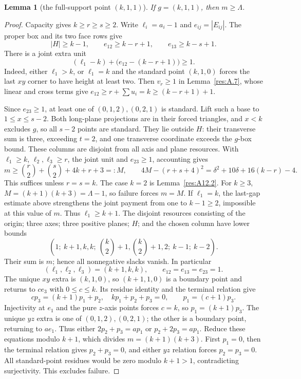 \documentclass[11pt]{article}
\newtheorem{lemma}[theorem]{Lemma}
\theoremstyle{definition}
\theoremstyle{remark}
\theoremstyle{plain}
\begin{document}
\begin{lemma}[the full-support point $(k,1,1)$]\label{res:A12.7}
If $g=(k,1,1)$, then $m\ge \Lambda$.
\end{lemma}
\begin{proof}
Capacity gives $k\ge r\ge s\ge2$.  Write $\ell_i=a_i-1$ and
$e_{ij}=|E_{ij}|$.  The proper box and its two face rows give
\[
 |H|\ge k-1,\qquad e_{12}\ge k-r+1,\qquad e_{13}\ge k-s+1.
\]
There is a joint extra unit
\[
 (\ell_1-k)+\bigl(e_{12}-(k-r+1)\bigr)\ge1.
\]
Indeed, either $\ell_1>k$, or $\ell_1=k$ and the standard point
$(k,1,0)$ forces the last $xy$ corner to have height at least two.
Then $v_r\ge1$ in Lemma~\ref{res:A.7}, whose linear and cross terms give
$e_{12}\ge r+\sum u_i=k\ge(k-r+1)+1$.

Since $e_{23}\ge1$, at least one of $(0,1,2),(0,2,1)$ is standard.
Lift such a base to $1\le x\le s-2$.  Both long-plane projections
are in their forced triangles, and $x<k$ excludes $g$, so all $s-2$
points are standard.  They lie outside $H$: their transverse sum is
three, exceeding $t=2$, and one transverse coordinate exceeds the
$g$-box bound.  These columns are disjoint from all axis and plane
resources.  With $\ell_1\ge k$, $\ell_2,\ell_3\ge r$, the joint unit
and $e_{23}\ge1$, accounting gives
\[
 m\ge\binom r2+\binom s2+4k+r+3=:M,\qquad
 4M-(r+s+4)^2=\delta^2+10\delta+16(k-r)-4.\tag{3.13}\label{eq:capacity-13}
\]
This suffices unless $r=s=k$.  The case $k=2$ is Lemma~\ref{res:A12.2}.
For $k\ge3$, $M=(k+1)(k+3)=\Lambda-1$, so failure forces $m=M$.
If $\ell_1=k$, the last-gap estimate above strengthens the joint
payment from one to $k-1\ge2$, impossible at this value of $m$.
Thus $\ell_1\ge k+1$.  The disjoint resources consisting of the
origin; three axes; three positive planes; $H$; and the chosen column
have lower bounds
\[
 \left(1;\ k+1,k,k;\ \binom k2+1,\binom k2+1,2;\ k-1;\ k-2\right).
\]
Their sum is $m$; hence all nonnegative slacks vanish.  In particular
\[
 (\ell_1,\ell_2,\ell_3)=(k+1,k,k),\qquad
 e_{12}=e_{13}=e_{23}=1.
\]
The unique $xy$ extra is $(k,1,0)$, so $(k+1,1,0)$ is a boundary
point and returns to $ce_3$ with $0\le c\le k$.  Its residue identity
and the terminal relation give
\[
 cp_3=(k+1)p_1+p_2,\quad kp_1+p_2+p_3=0,
 \qquad p_1=(c+1)p_3.
\]
Injectivity at $e_1$ and the pure $z$-axis points forces $c=k$, so
$p_1=(k+1)p_3$.
The unique $yz$ extra is one of $(0,1,2),(0,2,1)$; the other is a
boundary point, returning to $ae_1$.  Thus either
$2p_2+p_3=ap_1$ or $p_2+2p_3=ap_1$.
Reduce these equations modulo $k+1$, which divides
$m=(k+1)(k+3)$.  First $p_1=0$, then the terminal relation gives
$p_2+p_3=0$, and either $yz$ relation forces $p_2=p_3=0$.
All standard-point residues would be zero modulo $k+1>1$,
contradicting surjectivity.  This excludes failure. \end{proof}
\end{document}
